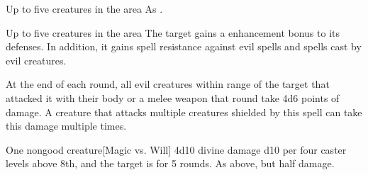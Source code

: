 \begin{spellheader}
\end{spellheader}
\begin{spelleffects}
    \begin{spelltargets}{Up to five creatures in the area}
        \spellsuccess As .
    \end{spelltargets}
\end{spelleffects}
\begin{spellfooter}
    
\end{spellfooter}

\begin{spellheader}
    \spelldur{\durshort \dismissable}
\end{spellheader}
\begin{spelleffects}
    \begin{spelltargets}{Up to five creatures in the area}
        The target gains a  enhancement bonus to its defenses. In addition, it gains spell resistance against evil spells and spells cast by evil creatures.
        \par At the end of each round, all evil creatures within \rngclose range of the target that attacked it with their body or a melee weapon that round take 4d6 points of damage. A creature that attacks multiple creatures shielded by this spell can take this damage multiple times.
    \end{spelltargets}
\end{spelleffects}
\begin{spellfooter}
    
\end{spellfooter}

\begin{spellheader}
    \spellrng{\rngmed}
\end{spellheader}
\begin{spelleffects}
    \begin{spelltarget}{One nongood creature}[Magic vs. Will]
        \spellsuccess 4d10 divine damage \add d10 per four caster levels above 8th, and the target is \bewildered for 5 rounds.
        \spellfailure As above, but half damage.
    \end{spelltarget}
\end{spelleffects}
\begin{spellfooter}
    
\end{spellfooter}

